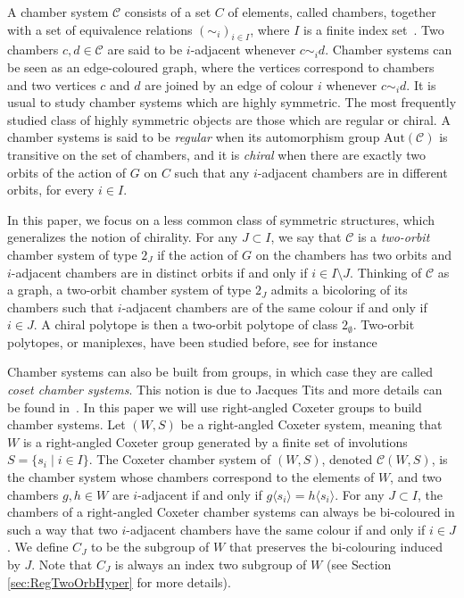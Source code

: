 \documentclass[10pt,a4paper]{amsart}
\newcommand{\Aut}{\mathrm{Aut}}
\newcommand{\C}{\mathcal{C}}
\begin{document}
A chamber system $\C$ consists of a set $C$ of elements, called chambers, together with a set of equivalence relations $(\sim_i)_{i\in I}$, where $I$ is a finite index set~\cite{buekenhout2013diagram}. Two chambers $c,d\in \C$ are said to be $i$-adjacent whenever $c\sim_i d$. Chamber systems can be seen as an edge-coloured graph, where the vertices correspond to chambers and two vertices $c$ and $d$ are joined by an edge of colour $i$ whenever $c \sim_i d$.
It is usual to study chamber systems which are highly symmetric. The most frequently studied class of highly symmetric objects are those which are regular or chiral. A chamber systems is said to be \emph{regular} when its automorphism group $\Aut(\C)$ is transitive on the set of chambers, and it is \emph{chiral} when there are exactly two orbits of the action of $G$ on $C$ such that any $i$-adjacent chambers are in different orbits, for every $i\in I$. 

In this paper, we focus on a less common class of symmetric structures, which generalizes the notion of chirality. For any $J\subset I$, we say that $\C$ is a \emph{two-orbit} chamber system of type $2_J$ if the action of $G$ on the chambers has two orbits and $i$-adjacent chambers are in distinct orbits if and only if $i\in I\setminus J$. Thinking of $\C$ as a graph, a two-orbit chamber system of type $2_J$ admits a bicoloring of its chambers such that $i$-adjacent chambers are of the same colour if and only if $i \in J$. A chiral polytope is then a two-orbit polytope of class $2_\emptyset$. Two-orbit polytopes, or maniplexes, have been studied before, see for instance \cite{Pellicer_2025,ExistanceTwoOrbitsManiplexes,Polytopality2orbitsmaniplexes}

Chamber systems can also be built from groups, in which case they are called \emph{coset chamber systems}. This notion is due to Jacques Tits and more details can be found in~\cite{buekenhout2013diagram}. In this paper we will use right-angled Coxeter groups to build chamber systems.
Let $(W,S)$ be a right-angled Coxeter system, meaning that $W$ is a right-angled Coxeter group generated by a finite set of involutions $S = \{s_i\mid i\in I\}$. The Coxeter chamber system of $(W,S)$, denoted $\C(W,S)$, is the chamber system whose chambers correspond to the elements of $W$, and two chambers $g,h\in W$ are $i$-adjacent if and only if $g\langle s_i\rangle = h\langle s_i\rangle$. For any $J \subset I$, the chambers of a right-angled Coxeter chamber systems can always be bi-coloured in such a way that two $i$-adjacent chambers have the same colour if and only if $i \in J$. We define $C_J$ to be the subgroup of $W$ that preserves the bi-colouring induced by $J$. Note that $C_J$ is always an index two subgroup of $W$ (see Section \ref{sec:RegTwoOrbHyper} for more details). 
\end{document}
